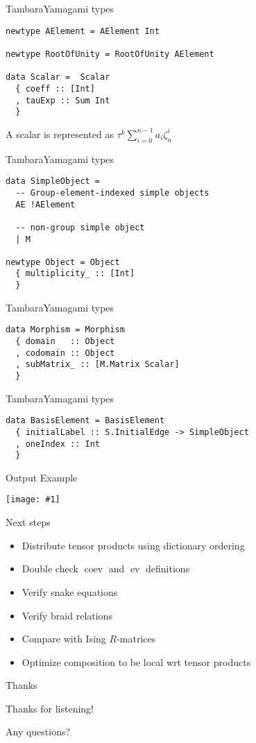 \documentclass{beamer}
\DeclareMathOperator{\ev}{ev}
\DeclareMathOperator{\coev}{coev}
\newcommand{\img}[1]{
\vfill
\texttt{[image: \#1]}
\vfill
}
\begin{document}
\begin{frame}[fragile]{TambaraYamagami types}
\begin{verbatim}
newtype AElement = AElement Int 

newtype RootOfUnity = RootOfUnity AElement

data Scalar =  Scalar 
  { coeff :: [Int]
  , tauExp :: Sum Int
  } 
\end{verbatim}

A scalar is represented as $\tau^k \sum_{i=0}^{n-1} a_i \zeta_n^i$
\end{frame}

\begin{frame}[fragile]{TambaraYamagami types}
\begin{verbatim}
data SimpleObject =
  -- Group-element-indexed simple objects
  AE !AElement

  -- non-group simple object
  | M

newtype Object = Object
  { multiplicity_ :: [Int]
  }
\end{verbatim}
\end{frame}

\begin{frame}[fragile]{TambaraYamagami types}
\begin{verbatim}
data Morphism = Morphism 
  { domain   :: Object
  , codomain :: Object
  , subMatrix_ :: [M.Matrix Scalar]
  }
\end{verbatim}
\end{frame}

\begin{frame}[fragile]{TambaraYamagami types}
\begin{verbatim}
data BasisElement = BasisElement
  { initialLabel :: S.InitialEdge -> SimpleObject
  , oneIndex :: Int
  }
\end{verbatim}
\end{frame}


\begin{frame}{Output Example}
\img{final}
\end{frame}

\begin{frame}{Next steps}
\begin{itemize}
\item Distribute tensor products using dictionary ordering 
\item Double check $\coev$ and $\ev$ definitions
\item Verify snake equations
\item Verify braid relations
\item Compare with Ising $R$-matrices
\item Optimize composition to be local wrt tensor products
\end{itemize}
\end{frame}

\begin{frame}{Thanks}

Thanks for listening!

Any questions?
\end{frame}
\end{document}
